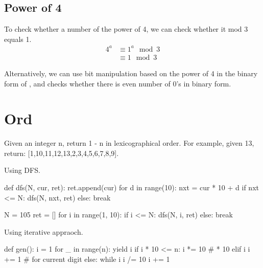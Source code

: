 \subsection{Power of 4}
To check whether a number of the power of 4, we can check whether it mod 3 equals 1.
\begin{align*}
4^a &\equiv 1^a\mod 3 \\
&\equiv 1 \mod 3
\end{align*}

Alternatively, we can use bit manipulation based on the power of 4 in the binary form of , and checks whether there is even number of 0's in binary form. 

\section{Ord}
 Given an integer n, return 1 - n in lexicographical order. For example, given 13, return: [1,10,11,12,13,2,3,4,5,6,7,8,9].

Using DFS.
\begin{python}
def dfs(N, cur, ret):
    ret.append(cur)
    for d in range(10):
        nxt = cur * 10 + d
        if nxt <= N:
            dfs(N, nxt, ret)
        else:
            break

N = 105
ret = []
for i in range(1, 10):
    if i <= N:
        dfs(N, i, ret)
    else:
        break
\end{python}

Using iterative appraoch. 
\begin{python}
def gen():
    i = 1
    for _ in range(n):
        yield i
        if i * 10 <= n:
            i *= 10  # * 10
        elif i %
            i += 1  # for current digit
        else:
            while i %
                i /= 10
            i += 1
\end{python}
